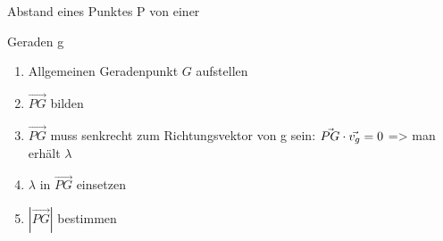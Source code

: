 \documentclass[paper=a6,landscape,ngerman,twoside=true,fontsize=12pt]{scrartcl}
\begin{document}
\begin{frage}
	\LARGE
	 Abstand eines Punktes P von einer 
	 
	 Geraden g
	
\end{frage}
\begin{antwort}
	\begin{enumerate} 
		\item Allgemeinen Geradenpunkt $G$ aufstellen
		\item $\vec{PG}$ bilden
		\item $\vec{PG}$ muss senkrecht zum Richtungsvektor von g sein: $\vec{PG} \cdot \vec{v_g}=0$ => man erhält $\lambda$
		
		\item $\lambda$ in  $\vec{PG}$ einsetzen
		\item $|\vec{PG}|$ bestimmen
		
	\end{enumerate} 
\end{antwort}			
\end{document}
